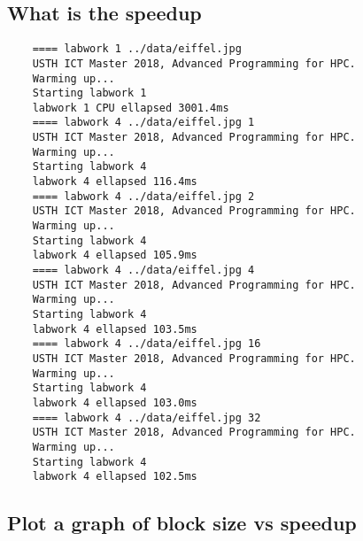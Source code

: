 \documentclass{article}
\begin{document}
\subsection{What is the speedup}
\begin{verbatim}
    ==== labwork 1 ../data/eiffel.jpg
    USTH ICT Master 2018, Advanced Programming for HPC.
    Warming up...
    Starting labwork 1
    labwork 1 CPU ellapsed 3001.4ms
    ==== labwork 4 ../data/eiffel.jpg 1
    USTH ICT Master 2018, Advanced Programming for HPC.
    Warming up...
    Starting labwork 4
    labwork 4 ellapsed 116.4ms
    ==== labwork 4 ../data/eiffel.jpg 2
    USTH ICT Master 2018, Advanced Programming for HPC.
    Warming up...
    Starting labwork 4
    labwork 4 ellapsed 105.9ms
    ==== labwork 4 ../data/eiffel.jpg 4
    USTH ICT Master 2018, Advanced Programming for HPC.
    Warming up...
    Starting labwork 4
    labwork 4 ellapsed 103.5ms
    ==== labwork 4 ../data/eiffel.jpg 16
    USTH ICT Master 2018, Advanced Programming for HPC.
    Warming up...
    Starting labwork 4
    labwork 4 ellapsed 103.0ms
    ==== labwork 4 ../data/eiffel.jpg 32
    USTH ICT Master 2018, Advanced Programming for HPC.
    Warming up...
    Starting labwork 4
    labwork 4 ellapsed 102.5ms

\end{verbatim}
\subsection{Plot a graph of block size vs speedup}
    
    \newline
    
\end{document}
